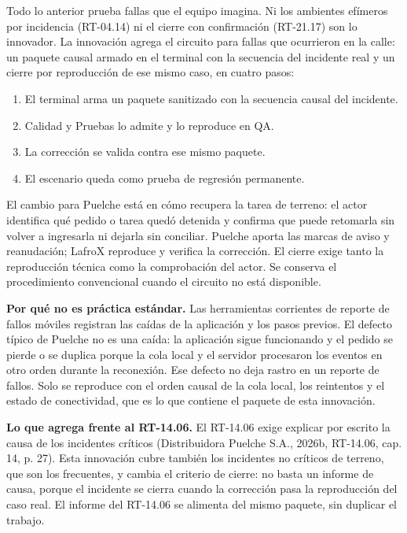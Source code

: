 Todo lo anterior prueba fallas que el equipo imagina. Ni los ambientes efímeros por incidencia (RT-04.14) ni el cierre con confirmación (RT-21.17) son lo innovador. La innovación agrega el circuito para fallas que ocurrieron en la calle: un paquete causal armado en el terminal con la secuencia del incidente real y un cierre por reproducción de ese mismo caso, en cuatro pasos:

\begin{enumerate}
  \item El terminal arma un paquete sanitizado con la secuencia causal del incidente.
  \item Calidad y Pruebas lo admite y lo reproduce en QA.
  \item La corrección se valida contra ese mismo paquete.
  \item El escenario queda como prueba de regresión permanente.
\end{enumerate}

El cambio para Puelche está en cómo recupera la tarea de terreno: el actor identifica qué pedido o tarea quedó detenida y confirma que puede retomarla sin volver a ingresarla ni dejarla sin conciliar. Puelche aporta las marcas de aviso y reanudación; LafroX reproduce y verifica la corrección. El cierre exige tanto la reproducción técnica como la comprobación del actor. Se conserva el procedimiento convencional cuando el circuito no está disponible.

\textbf{Por qué no es práctica estándar.} Las herramientas corrientes de reporte de fallos móviles registran las caídas de la aplicación y los pasos previos. El defecto típico de Puelche no es una caída: la aplicación sigue funcionando y el pedido se pierde o se duplica porque la cola local y el servidor procesaron los eventos en otro orden durante la reconexión. Ese defecto no deja rastro en un reporte de fallos. Solo se reproduce con el orden causal de la cola local, los reintentos y el estado de conectividad, que es lo que contiene el paquete de esta innovación.

\textbf{Lo que agrega frente al RT-14.06.} El RT-14.06 exige explicar por escrito la causa de los incidentes críticos (Distribuidora Puelche S.A., 2026b, RT-14.06, cap. 14, p. 27). Esta innovación cubre también los incidentes no críticos de terreno, que son los frecuentes, y cambia el criterio de cierre: no basta un informe de causa, porque el incidente se cierra cuando la corrección pasa la reproducción del caso real. El informe del RT-14.06 se alimenta del mismo paquete, sin duplicar el trabajo.


